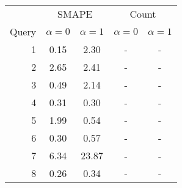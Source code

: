\begin{tabular}{rcccc}
\toprule
       & \multicolumn{2}{c}{SMAPE} & \multicolumn{2}{c}{Count}                                  \\
Query  & $\alpha = 0$              & $\alpha = 1$                 & $\alpha = 0$ & $\alpha = 1$ \\
\midrule
    1  & 0.15                      & 2.30                         & -            & -            \\
    2  & 2.65                      & 2.41                         & -            & -            \\
    3  & 0.49                      & 2.14                         & -            & -            \\
    4  & 0.31                      & 0.30                         & -            & -            \\
    5  & 1.99                      & 0.54                         & -            & -            \\
    6  & 0.30                      & 0.57                         & -            & -            \\
    7  & 6.34                      & 23.87                        & -            & -            \\
    8  & 0.26                      & 0.34                         & -            & -            \\
\bottomrule
\end{tabular}
